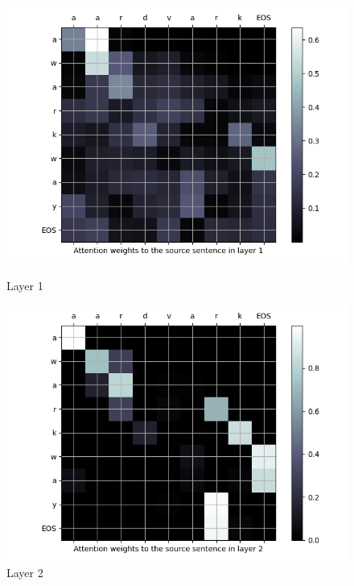 \begin{enumarabic}
    \begin{figure}[H]
      \centering
      \begin{minipage}[b]{0.33\textwidth}
        \centering
        \includegraphics[width=\textwidth]{figures/aardvark-0.png}
        \caption{Layer 1}
        \label{fig:aardvark-0}
      \end{minipage}
      \hfill
      \begin{minipage}[b]{0.33\textwidth}
        \centering
        \includegraphics[width=\textwidth]{figures/aardvark-1.png}
        \caption{Layer 2}
        \label{fig:aardvark-1}
      \end{minipage}
      \begin{minipage}[b]{0.33\textwidth}

\end{minipage}
\end{figure}
\end{enumarabic}
